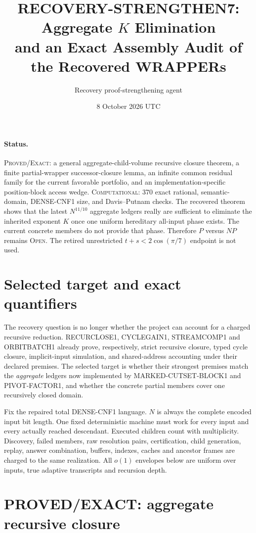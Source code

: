 \documentclass[11pt]{article}
\title{RECOVERY-STRENGTHEN7: Aggregate $K$ Elimination\\and an Exact Assembly Audit of the Recovered WRAPPERs}
\author{Recovery proof-strengthening agent}
\date{8 October 2026 UTC}
\begin{document}
\sloppy\maketitle

\paragraph{Status.}
\textsc{Proved/Exact}: a general aggregate-child-volume recursive closure
theorem, a finite partial-wrapper successor-closure lemma, an infinite common
residual family for the current favorable portfolio, and an
implementation-specific position-block access wedge.  \textsc{Computational}:
370 exact rational, semantic-domain, DENSE-CNF1 size, and Davis--Putnam
checks.  The recovered theorem shows that the latest $N^{11/10}$ aggregate
ledgers really are sufficient to eliminate the inherited exponent $K$ once
one uniform hereditary all-input phase exists.  The current concrete members
do not provide that phase.  Therefore $P$ versus $NP$ remains \textsc{Open}.
The retired unrestricted $t+s<2\cos(\pi/7)$ endpoint is not used.

\section{Selected target and exact quantifiers}

The recovery question is no longer whether the project can account for a
charged recursive reduction.  RECURCLOSE1, CYCLEGAIN1, STREAMCOMP1 and
ORBITBATCH1 already prove, respectively, strict recursive closure, typed
cycle closure, implicit-input simulation, and shared-address accounting under
their declared premises.  The selected target is whether their strongest
premises match the \emph{aggregate} ledgers now implemented by
MARKED-CUTSET-BLOCK1 and PIVOT-FACTOR1, and whether the concrete partial
members cover one recursively closed domain.

Fix the repaired total DENSE-CNF1 language.  $N$ is always the complete
encoded input bit length.  One fixed deterministic machine must work for
every input and every actually reached descendant.  Executed children count
with multiplicity.  Discovery, failed members, raw resolution pairs,
certification, child generation, replay, answer combination, buffers, indexes,
caches and ancestor frames are charged to the same realization.  All
$o(1)$ envelopes below are uniform over inputs, true adaptive transcripts
and recursion depth.

\section{PROVED/EXACT: aggregate recursive closure}
\end{document}

